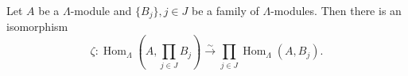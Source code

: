 Let $A$ be a $\Lambda$-module and $\{B_j\}, j \in J$ be a family of $\Lambda$-modules. Then there is an isomorphism
$$\zeta : \operatorname{Hom}_\Lambda \left( A, \prod_{j \in J} B_j \right) \xrightarrow{\sim} \prod_{j \in J} \operatorname{Hom}_\Lambda(A, B_j).$$

